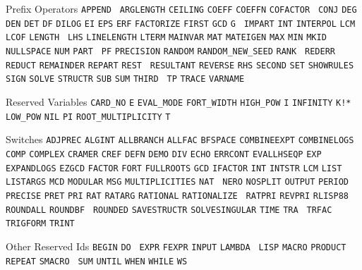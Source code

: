 \documentclass[11pt,letterpaper]{book}
\begin{document}
\begin{list}{}
\item[Prefix Operators] {\tt APPEND} {\tt
ARGLENGTH} {\tt CEILING} {\tt COEFF} {\tt COEFFN} {\tt COFACTOR} {\tt
CONJ} {\tt DEG} {\tt DEN} {\tt DET} {\tt DF} {\tt DILOG} {\tt EI}
{\tt EPS} {\tt ERF} {\tt FACTORIZE} {\tt FIRST} {\tt GCD} {\tt G} {\tt
IMPART} {\tt INT} {\tt INTERPOL} {\tt LCM} {\tt LCOF} {\tt LENGTH} {\tt
LHS} {\tt LINELENGTH} {\tt LTERM} {\tt MAINVAR} {\tt MAT} {\tt MATEIGEN}
{\tt MAX} {\tt MIN} {\tt MKID} {\tt NULLSPACE} {\tt NUM} {\tt PART} {\tt
PF} {\tt PRECISION} {\tt RANDOM} {\tt RANDOM\_NEW\_SEED} {\tt RANK} {\tt
REDERR} {\tt REDUCT} {\tt REMAINDER} {\tt REPART} {\tt REST} {\tt
RESULTANT} {\tt REVERSE} {\tt RHS} {\tt SECOND} {\tt SET} {\tt SHOWRULES}
{\tt SIGN} {\tt SOLVE} {\tt STRUCTR} {\tt SUB} {\tt SUM} {\tt THIRD} {\tt
TP} {\tt TRACE} {\tt VARNAME}

\item[Reserved Variables] {\tt CARD\_NO} {\tt E} {\tt EVAL\_MODE}
{\tt FORT\_WIDTH} {\tt HIGH\_POW} {\tt I} {\tt INFINITY} {\tt K!*} {\tt
LOW\_POW} {\tt NIL} {\tt PI} {\tt ROOT\_MULTIPLICITY} {\tt T}

\item[Switches] {\tt ADJPREC} {\tt ALGINT} {\tt ALLBRANCH} {\tt ALLFAC}
{\tt BFSPACE} {\tt COMBINEEXPT} {\tt COMBINELOGS}
{\tt COMP} {\tt COMPLEX} {\tt CRAMER} {\tt CREF} {\tt DEFN} {\tt DEMO}
{\tt DIV} {\tt ECHO} {\tt ERRCONT} {\tt EVALLHSEQP} {\tt EXP} {\tt
EXPANDLOGS} {\tt EZGCD} {\tt FACTOR} {\tt FORT} {\tt FULLROOTS} {\tt GCD}
{\tt IFACTOR} {\tt INT} {\tt INTSTR} {\tt LCM} {\tt LIST} {\tt LISTARGS}
{\tt MCD} {\tt MODULAR} {\tt MSG} {\tt MULTIPLICITIES} {\tt NAT} {\tt
NERO} {\tt NOSPLIT} {\tt OUTPUT} {\tt PERIOD} {\tt PRECISE} {\tt PRET}
{\tt PRI} {\tt RAT} {\tt RATARG} {\tt RATIONAL} {\tt RATIONALIZE} {\tt
RATPRI} {\tt REVPRI} {\tt RLISP88} {\tt ROUNDALL} {\tt ROUNDBF} {\tt
ROUNDED} {\tt SAVESTRUCTR} {\tt SOLVESINGULAR} {\tt TIME} {\tt TRA} {\tt
TRFAC} {\tt TRIGFORM} {\tt TRINT}

\item[Other Reserved Ids] {\tt BEGIN} {\tt DO} {\tt
EXPR} {\tt FEXPR} {\tt INPUT} {\tt LAMBDA} {\tt
LISP} {\tt MACRO} {\tt PRODUCT} {\tt REPEAT} {\tt SMACRO} {\tt
SUM} {\tt UNTIL} {\tt WHEN} {\tt WHILE} {\tt WS}

\end{list}

\newpage
{}

\appendix



\printindex
\end{document}
